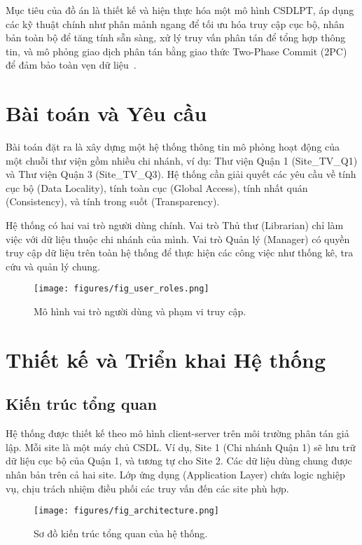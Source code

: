 \documentclass[conference]{IEEEtran}
\begin{document}
Mục tiêu của đồ án là thiết kế và hiện thực hóa một mô hình CSDLPT, áp dụng các kỹ thuật chính như phân mảnh ngang để tối ưu hóa truy cập cục bộ, nhân bản toàn bộ để tăng tính sẵn sàng, xử lý truy vấn phân tán để tổng hợp thông tin, và mô phỏng giao dịch phân tán bằng giao thức Two-Phase Commit (2PC) để đảm bảo toàn vẹn dữ liệu~\cite{ozsu_valduriez_2020}.

\section{Bài toán và Yêu cầu}
Bài toán đặt ra là xây dựng một hệ thống thông tin mô phỏng hoạt động của một chuỗi thư viện gồm nhiều chi nhánh, ví dụ: Thư viện Quận 1 (Site\_TV\_Q1) và Thư viện Quận 3 (Site\_TV\_Q3). Hệ thống cần giải quyết các yêu cầu về tính cục bộ (Data Locality), tính toàn cục (Global Access), tính nhất quán (Consistency), và tính trong suốt (Transparency).

Hệ thống có hai vai trò người dùng chính. Vai trò Thủ thư (Librarian) chỉ làm việc với dữ liệu thuộc chi nhánh của mình. Vai trò Quản lý (Manager) có quyền truy cập dữ liệu trên toàn hệ thống để thực hiện các công việc như thống kê, tra cứu và quản lý chung.

\begin{figure}[!h]
\centering
\texttt{[image: figures/fig\_user\_roles.png]} 
\caption{Mô hình vai trò người dùng và phạm vi truy cập.}
\label{fig_user_roles}
\end{figure}

\section{Thiết kế và Triển khai Hệ thống}
\subsection{Kiến trúc tổng quan}
Hệ thống được thiết kế theo mô hình client-server trên môi trường phân tán giả lập. Mỗi site là một máy chủ CSDL. Ví dụ, Site 1 (Chi nhánh Quận 1) sẽ lưu trữ dữ liệu cục bộ của Quận 1, và tương tự cho Site 2. Các dữ liệu dùng chung được nhân bản trên cả hai site. Lớp ứng dụng (Application Layer) chứa logic nghiệp vụ, chịu trách nhiệm điều phối các truy vấn đến các site phù hợp.

\begin{figure}[!h]
\centering
\texttt{[image: figures/fig\_architecture.png]} 
\caption{Sơ đồ kiến trúc tổng quan của hệ thống.}
\label{fig_architecture}
\end{figure}
\end{document}
